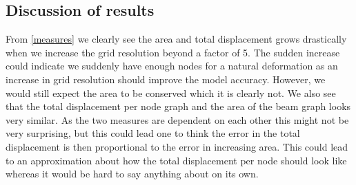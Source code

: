 \subsection{Discussion of results}
From \autoref{measures} we clearly see the area and total displacement grows drastically when we increase the grid resolution beyond a factor of 5. The sudden increase could indicate we suddenly have enough nodes for a natural deformation as an increase in grid resolution should improve the model accuracy. However, we would still expect the area to be conserved which it is clearly not. We also see that the total displacement per node graph and the area of the beam graph looks very similar. As the two measures are dependent on each other this might not be very surprising, but this could lead one to think the error in the total displacement is then proportional to the error in increasing area. This could lead to an approximation about how the total displacement per node should look like whereas it would be hard to say anything about on its own.  